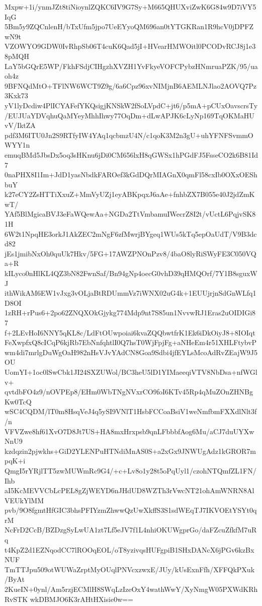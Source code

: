 Mxpw+1i/ynmJZt8tiNioynlZQKC6IV9G7Sy+M665QHUXviZwK6G84w9D7iVY5IqG
5Bm5y9ZQCnlenH/bTxUfm5jpo7UeEYyoQM696an0tYTGKRan1R9hcV0jDPFZwN9t
VZOWYO9GDW0IvRhpSb06T4cuK6Qad5jI+HVearHMWOitl0PCODvRCJ8j1e38pMQH
LaY5bGQrE5WP/FkhFSdjCIHgzhXVZH1YvFkyeVOFCPybzHNmruaPZK/95/uaoh4z
9BFNQdMtO+TFlNW6WCT9Z9g/6a6Cpz96xvNIMjnB6AEMLNJlao2AOVQ7Pz3Kxk73
yV1lyDcdiw4PlICYAFefYKQsigjKNSkW2fSoLVpdC+jt6/p5mA+pCUxOavscrsTy
/EUJUaYDVqhuQaMYeyMhhIhwy77OqDm+dLwAPJK6cLyNp169TqOKMaHUvV/IktZA
pdf3M6ITU0Jn2S9RTfyIW4YAq1qcbmzU4N/c1qoK3M2n3gU+uhYFNFSvmmOWYY1n
emuqBMd5JbsDx5oq3sHKnu6jDi0CM656lxH8qGWSx1hPGdFJ5FsseCO2k6B81Id7
0naPHX8I1Im+JdD1yasNbdkFAROef3kGdDQrMIAGnX0qmFl58cxIb0OXxOEShbuY
k27eCY2ZsHTTiXxuZ+MmVyUZj1eyABKpqxJ6aAe+fnhbZX7B055e40J2jdZmKwT/
YAf5BlMgicaBVJ3eFaWQewAa+NGDa2TtVmbamuIWecrZ8I2t/vUctL6PqjvSK81H
6W2t1NpqHE3orkJ1AkZEC2mNgF6zfMwrjBYgeq1WUs5kTq5epOaUdT/V9B3dcd82
jEs1jmibNxOh0quUk7Hkv/5FG+17AWZPNOnPzv8/4baO8lyRiSWyFE3C050VQa+R
kILyco0nHlKL4QZ3bN82FwnSaf/Bn94gNp4oecG0vhD39qHMQOrf/7Y1B8sguxWJ
ithWikAM6EW1vJxg3vOLjaBtRDUmmVz7iWNX02uG4k+1EUUjrjnSdGnWLfq1D8OI
1zRH+rPus6+2po62ZNQXOkGjykg774Mdp9nt7S85un1NvvwRJ1Eras2uOIDIGi87
f+2LEvHoI6NNY5qKL8c/LdFtOUwpoiai6kvaZQQbwtfrK1Ek6iDkOiyJ8+8IOIqt
FeXwpfxQ8cICqP6kjRb7EbNnfqhtlI0Q7hsT0WjFpjFg+aNHeEm4r51XHLFtybvP
wm4di7mrlgDuWgOaH982nHsVJvYAdCN8Goa9Sdbi4jfEYLsMcoAdRvZEajW9J5OU
UomYI+1oc0lSwCbk1JI24SXZUWol/BC3heU5lD1YIMaeeqiVTV8NbDsa+nfWGlv+
qvtdbFO4z9/nOVPEp8/EHm0WbTNgNVxrCO9foI6KTv45Rp4qMuZOnZHNBgKw0TcQ
wSC4CQDM/lT0m8HsqVeJ4q5ySI9VNlT1HsbFCCoaBsiV1weNmfbmFXXdlNlt3f/n
VFVZwe8hf61XvO7D8Jt7US+HA8mxHrxpsb9qnLFbbbfAog6Mu/aCJ7duUYXwNnU9
kzdqzin2pjwkhs+GiD2YLENPuHTNdiMnAS0S+a2xGx9JNWUgAdz1kGROR7mpqK+i
QmgI5rYRjlTT5zwMUWmRc9G4/+c+Lv8o1y28t5oPqUyl1/czohNTQmfZL1FN/Ihb
aI5KcMEVVCbLcPEL8gZjWEYD6nJHdUD8WZTh3rVwcNT21ohAmWNRN8AlVEUkYlMM
pvb/9O8fgmtHfGIC3bhsPFIYzmZhwwQzUwXkffS3S1sdWEqTJ7IKVOEtYSYt0qrM
NcFrD2CcB/BZDzgSyLwUA1zt7Lf5eJV7f1L4nhiOKUWgprGo/daFZcuZfkfM7uRq
t4KpZ2d1EZNqodCC7lROOqEOL/oT8yzivqsHUFgpiB1SHxDANcX6jPGv6kzBxNUF
TmTTJpu509otWUWaZrptMyOUqlPNVcxzwxE/JUy/kUsExnFfh/XFFQkPXuk/ByAt
2KueIN+0ynl/Am5rzjECMlH8SWqLzIzeOxY4wathWwY/XyNmgW05PXWdKRhRvSTK
wkDBMJO6K3rAHtHXisie0w==
